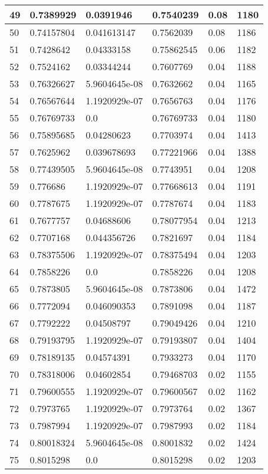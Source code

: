 \begin{longtable}{|l|l|l|l|l|l|}
49 & 0.7389929 & 0.0391946 & 0.7540239 & 0.08 & 1180 \\ \hline 
50 & 0.74157804 & 0.041613147 & 0.7562039 & 0.08 & 1186 \\ \hline 
51 & 0.7428642 & 0.04333158 & 0.75862545 & 0.06 & 1182 \\ \hline 
52 & 0.7524162 & 0.03344244 & 0.7607769 & 0.04 & 1188 \\ \hline 
53 & 0.76326627 & 5.9604645e-08 & 0.7632662 & 0.04 & 1165 \\ \hline 
54 & 0.76567644 & 1.1920929e-07 & 0.7656763 & 0.04 & 1176 \\ \hline 
55 & 0.76769733 & 0.0 & 0.76769733 & 0.04 & 1180 \\ \hline 
56 & 0.75895685 & 0.04280623 & 0.7703974 & 0.04 & 1413 \\ \hline 
57 & 0.7625962 & 0.039678693 & 0.77221966 & 0.04 & 1388 \\ \hline 
58 & 0.77439505 & 5.9604645e-08 & 0.7743951 & 0.04 & 1208 \\ \hline 
59 & 0.776686 & 1.1920929e-07 & 0.77668613 & 0.04 & 1191 \\ \hline 
60 & 0.7787675 & 1.1920929e-07 & 0.7787674 & 0.04 & 1183 \\ \hline 
61 & 0.7677757 & 0.04688606 & 0.78077954 & 0.04 & 1213 \\ \hline 
62 & 0.7707168 & 0.044356726 & 0.7821697 & 0.04 & 1184 \\ \hline 
63 & 0.78375506 & 1.1920929e-07 & 0.78375494 & 0.04 & 1203 \\ \hline 
64 & 0.7858226 & 0.0 & 0.7858226 & 0.04 & 1208 \\ \hline 
65 & 0.7873805 & 5.9604645e-08 & 0.7873806 & 0.04 & 1472 \\ \hline 
66 & 0.7772094 & 0.046090353 & 0.7891098 & 0.04 & 1187 \\ \hline 
67 & 0.7792222 & 0.04508797 & 0.79049426 & 0.04 & 1210 \\ \hline 
68 & 0.79193795 & 1.1920929e-07 & 0.79193807 & 0.04 & 1404 \\ \hline 
69 & 0.78189135 & 0.04574391 & 0.7933273 & 0.04 & 1170 \\ \hline 
70 & 0.78318006 & 0.04602854 & 0.79468703 & 0.02 & 1155 \\ \hline 
71 & 0.79600555 & 1.1920929e-07 & 0.79600567 & 0.02 & 1162 \\ \hline 
72 & 0.7973765 & 1.1920929e-07 & 0.7973764 & 0.02 & 1367 \\ \hline 
73 & 0.7987994 & 1.1920929e-07 & 0.7987993 & 0.02 & 1184 \\ \hline 
74 & 0.80018324 & 5.9604645e-08 & 0.8001832 & 0.02 & 1424 \\ \hline 
75 & 0.8015298 & 0.0 & 0.8015298 & 0.02 & 1203 \\ \hline 
\end{longtable}